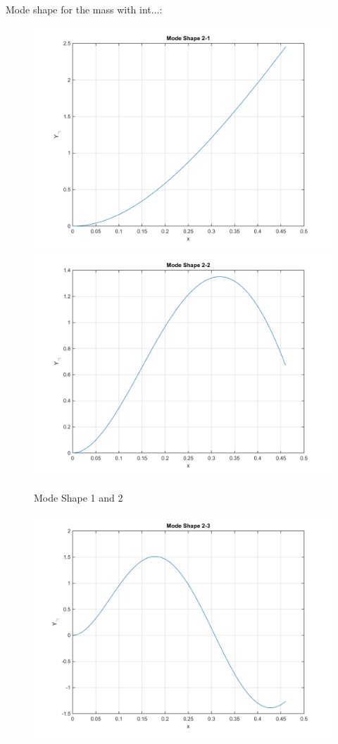 \documentclass[14pt,a4paper]{article}
\begin{document}
\begin{enumerate}
	Mode shape for the mass with int...:
	\begin{figure}[htp]
		\centering
		\includegraphics[scale=0.4]{fn1_VB2_mode1.png}
		\includegraphics[scale=0.4]{fn1_VB2_mode2.png}
		\caption{Mode Shape 1 and 2}
	\end{figure}
	\begin{figure}[htp]
		\centering
		\includegraphics[scale=0.4]{fn1_VB2_mode3.png}

\end{figure}
\end{enumerate}
\end{document}
